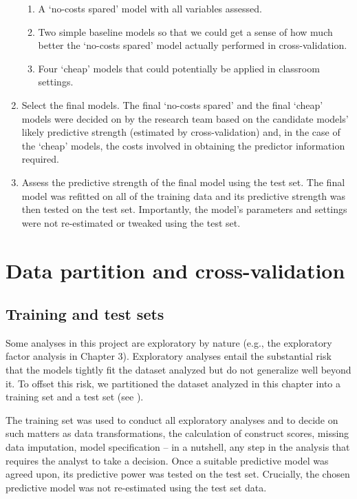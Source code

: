 \documentclass[output=paper]{langsci/langscibook}
\begin{document}
\begin{enumerate}
\begin{enumerate}[label=\alph*.]
\item A ‘no-costs spared’ model with all variables assessed.
\item Two simple baseline models so that we could get a sense of how much better the ‘no-costs spared’ model actually performed in cross-validation.
\item Four ‘cheap’ models that could potentially be applied in classroom settings.
\end{enumerate}
\item Select the final models. The final ‘no-costs spared’ and the final ‘cheap’ models were decided on by the research team based on the candidate models’ likely predictive strength (estimated by cross-validation) and, in the case of the ‘cheap’ models, the costs involved in obtaining the predictor information required.
\item Assess the predictive strength of the final model using the test set. The final model was refitted on all of the training data and its predictive strength was then tested on the test set. Importantly, the model’s parameters and settings were not re-estimated or tweaked using the test set.
\end{enumerate}

\section{Data partition and cross-validation}
\subsection{Training and test sets}

Some analyses in this project are exploratory by nature (e.g., the exploratory factor analysis in Chapter 3). Exploratory analyses entail the substantial risk that the models tightly fit the dataset analyzed but do not generalize well beyond it. To offset this risk, we partitioned the dataset analyzed in this chapter into a training set and a test set (see \citealt{KuhnJohnson2013}).

The training set was used to conduct all exploratory analyses and to decide on such matters as data transformations, the calculation of construct scores, missing data imputation, model specification -- in a nutshell, any step in the analysis that requires the analyst to take a decision. Once a suitable predictive model was agreed upon, its predictive power was tested on the test set. Crucially, the chosen predictive model was not re-estimated using the test set data.
\end{document}
